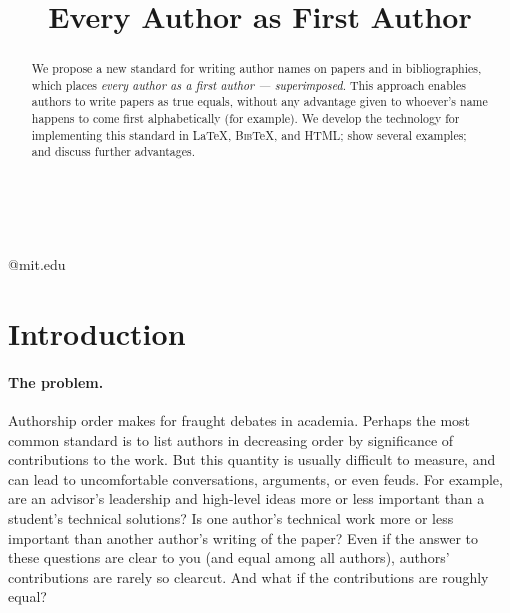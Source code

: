 \documentclass[natbib,authoryear]{sigtbd17-style}
\def\BibTeX{\textsc{Bib}\TeX}
\begin{document}
\title{Every Author as First Author}

%
%

{ \\
  \\
}
{@mit.edu}

\maketitle

\begin{abstract}
  We propose a new standard for writing author names on papers
  and in bibliographies, which places
  \emph{every author as a first author --- superimposed}.
  This approach enables authors to write papers as true equals,
  without any advantage given to whoever's name
  happens to come first alphabetically (for example).
  We develop the technology for implementing this standard
  in \LaTeX, \BibTeX, and HTML;
  show several examples; and discuss further advantages.
\end{abstract}

\section{Introduction}

\paragraph{The problem.}

Authorship order makes for fraught debates in academia.
Perhaps the most common standard is to list authors in decreasing order
by significance of contributions to the work.
But this quantity is usually difficult to measure,
and can lead to uncomfortable conversations, arguments, or even feuds.
For example, are an advisor's leadership and high-level ideas
more or less important than a student's technical solutions?
Is one author's technical work more or less important than
another author's writing of the paper?
Even if the answer to these questions are clear to you
(and equal among all authors), authors' contributions are rarely so clearcut.
And what if the contributions are roughly equal?
\end{document}
